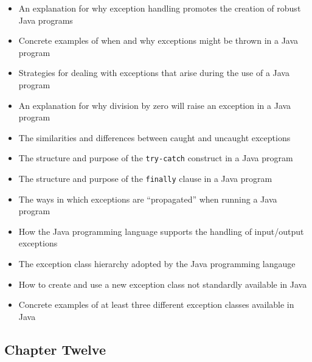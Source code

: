 \documentclass[11pt]{article}
\begin{document}
\begin{itemize}

  \itemsep 0in

  \item An explanation for why exception handling promotes the creation of
    robust Java programs
  \item Concrete examples of when and why exceptions might be thrown in a Java program
  \item Strategies for dealing with exceptions that arise during the use of a Java program
  \item An explanation for why division by zero will raise an exception in a Java program
  \item The similarities and differences between caught and uncaught exceptions
  \item The structure and purpose of the {\tt try-catch} construct in a Java program
  \item The structure and purpose of the {\tt finally} clause in a Java program
  \item The ways in which exceptions are ``propagated'' when running a Java program
  \item How the Java programming language supports the handling of input/output exceptions
  \item The exception class hierarchy adopted by the Java programming langauge
  \item How to create and use a new exception class not standardly available in Java
  \item Concrete examples of at least three different exception classes available in Java

\end{itemize}

\subsection*{Chapter Twelve}
\end{document}
